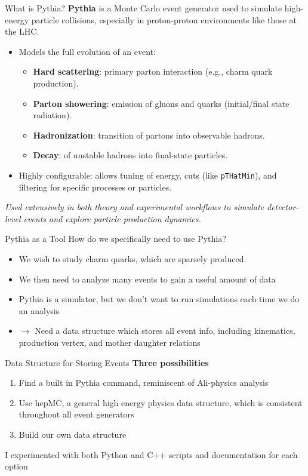 \documentclass[10pt]{beamer}
\begin{document}
\begin{frame}{What is Pythia?}
\textbf{Pythia} is a Monte Carlo event generator used to simulate high-energy particle collisions, especially in proton-proton environments like those at the LHC.

\vspace{0.5em}
\begin{itemize}
    \item Models the full evolution of an event:
    \begin{itemize}
        \item \textbf{Hard scattering}: primary parton interaction (e.g., charm quark production).
        \item \textbf{Parton showering}: emission of gluons and quarks (initial/final state radiation).
        \item \textbf{Hadronization}: transition of partons into observable hadrons.
        \item \textbf{Decay}: of unstable hadrons into final-state particles.
    \end{itemize}
    \item Highly configurable: allows tuning of energy, cuts (like \texttt{pTHatMin}), and filtering for specific processes or particles.
\end{itemize}
\vspace{0.5em}
\textit{Used extensively in both theory and experimental workflows to simulate detector-level events and explore particle production dynamics.}
\end{frame}

\begin{frame}{Pythia as a Tool}
How do we specifically need to use Pythia?
\begin{itemize}
    \item We wish to study charm quarks, which are sparsely produced.
    \item We then need to analyze many events to gain a useful amount of data
    \item Pythia is a simulator, but we don't want to run simulations each time we do an analysis
    \item $\rightarrow$ Need a data structure which stores all event info, including kinematics, production vertex, and mother daughter relations
\end{itemize}
\end{frame}

\begin{frame}{Data Structure for Storing Events}
\textbf{Three possibilities}
\begin{enumerate}
    \item Find a built in Pythia command, reminiscent of Ali-physics analysis
    \item Use hepMC, a general high energy physics data structure, which is consistent throughout all event generators
    \item Build our own data structure
\end{enumerate}
\vspace{1em}
I experimented with both Python and C++ scripts and documentation for each option
\end{frame}
\end{document}
